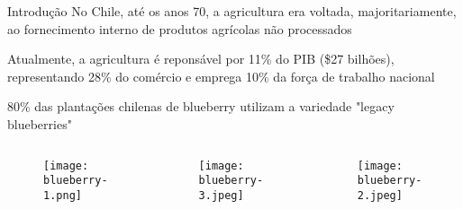 \begin{frame}[t]{Introdução} 
    \newcommand\vspaceintro{0.2cm}
    \transdissolve[duration=0.5]
    No Chile, até os anos 70, a agricultura era voltada, majoritariamente, ao fornecimento interno de produtos agrícolas não processados \cite{blueberryrecognition}\vspace{\vspaceintro}
    
    Atualmente, a agricultura é reponsável por 11\% do PIB (\$27 bilhões), representando 28\% do comércio e emprega 10\% da força de trabalho nacional\cite{ChilePIB:online} \vspace{\vspaceintro} 

    80\% das plantações chilenas de blueberry utilizam a variedade "legacy blueberries"
    \vspace{-0.4cm}
    \begin{columns}[t]
        \begin{center}
                \begin{figure}
                    \texttt{[image: blueberry-1.png]}
                \end{figure}
        \end{center}

        \begin{center}
                \begin{figure}
                    \texttt{[image: blueberry-3.jpeg]}
                \end{figure}
        \end{center}

        \begin{center}
                \begin{figure}
                    \texttt{[image: blueberry-2.jpeg]}
                \end{figure}
        \end{center}

    \end{columns}
\end{frame}

